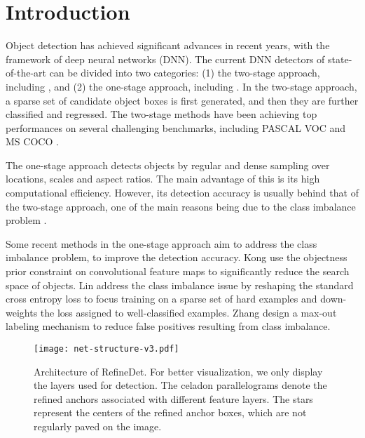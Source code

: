 \documentclass[10pt,twocolumn,letterpaper]{article}
\begin{document}
\section{Introduction}

Object detection has achieved significant advances in recent years, with the framework of deep neural networks (DNN). The current DNN detectors of state-of-the-art can be divided into two categories: (1) the two-stage approach, including \cite{DBLP:conf/eccv/CaiFFV16,DBLP:conf/iccv/Girshick15,DBLP:journals/pami/RenHG017,DBLP:conf/cvpr/ShrivastavaGG16}, and (2) the one-stage approach, including \cite{DBLP:conf/eccv/LiuAESRFB16, DBLP:journals/corr/RedmonF16}. In the two-stage approach, a sparse set of candidate object boxes is first generated, and then they are further classified and regressed. The two-stage methods have been achieving top performances on several challenging benchmarks, including PASCAL VOC \cite{DBLP:journals/ijcv/EveringhamGWWZ10} and MS COCO \cite{DBLP:conf/eccv/LinMBHPRDZ14}.

The one-stage approach detects objects by regular and dense sampling over locations, scales and aspect ratios. The main advantage of this is its high computational efficiency. However, its detection accuracy is usually behind that of the two-stage approach, one of the main reasons being due to the class imbalance problem \cite{DBLP:conf/iccv/LinPRK17}.

Some recent methods in the one-stage approach aim to address the class imbalance problem, to improve the detection accuracy. Kong \etal \cite{DBLP:conf/cvpr/KongSYLLC17} use the objectness prior constraint on convolutional feature maps to significantly reduce the search space of objects. Lin \etal \cite{DBLP:conf/iccv/LinPRK17} address the class imbalance issue by reshaping the standard cross entropy loss to focus training on a sparse set of hard examples and down-weights the loss assigned to well-classified examples. Zhang \etal \cite{DBLP:conf/iccv/abs-1708-05237} design a max-out labeling mechanism to reduce false positives resulting from class imbalance.

\begin{figure*}[t]
\centering
\texttt{[image: net-structure-v3.pdf]}
\vspace{-2mm}
\caption{Architecture of RefineDet. For better visualization, we only display the layers used for detection. The celadon parallelograms denote the refined anchors associated with different feature layers. The stars represent the centers of the refined anchor boxes, which are not regularly paved on the image.}
\label{fig:net-structure}
\end{figure*}
\end{document}
